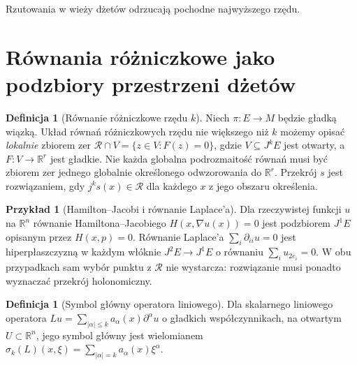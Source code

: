 \documentclass[11pt,a4paper,oneside]{book}
\numberwithin{equation}{chapter}
\theoremstyle{plain}
\theoremstyle{definition}
\newtheorem{definicja}[twierdzenie]{Definicja}
\newtheorem{przyklad}[twierdzenie]{Przykład}
\theoremstyle{remark}
\begin{document}
\begin{center}

{\small Rzutowania w wieży dżetów odrzucają pochodne najwyższego rzędu.}
\end{center}

\section{Równania różniczkowe jako podzbiory przestrzeni dżetów}
\begin{definicja}[Równanie różniczkowe rzędu $k$]
\label{def:dzety-pde}
Niech $\pi:E\to M$ będzie gładką wiązką.
Układ równań różniczkowych rzędu nie większego niż $k$
możemy opisać \emph{lokalnie} zbiorem zer
$\mathcal R\cap V=\{z\in V:F(z)=0\}$, gdzie
$V\subseteq J^kE$ jest otwarty, a
$F:V\to\mathbb R^r$ jest gładkie. Nie każda globalna
podrozmaitość równań musi być zbiorem zer jednego
globalnie określonego odwzorowania do $\mathbb R^r$.
Przekrój $s$ jest rozwiązaniem, gdy $j^ks(x)\in\mathcal R$
dla każdego $x$ z jego obszaru określenia.
\end{definicja}

\begin{przyklad}[Hamilton--Jacobi i równanie Laplace'a]
Dla rzeczywistej funkcji $u$ na $\mathbb R^n$
równanie Hamiltona--Jacobiego
$H(x,\nabla u(x))=0$ jest podzbiorem $J^1E$
opisanym przez $H(x,p)=0$. Równanie Laplace'a
$\sum_i\partial_{ii}u=0$ jest hiperpłaszczyzną
w każdym włóknie $J^2E\to J^1E$ o równaniu
$\sum_i u_{2e_i}=0$. W obu przypadkach sam wybór
punktu z $\mathcal R$ nie wystarcza: rozwiązanie
musi ponadto wyznaczać przekrój holonomiczny.
\end{przyklad}

\begin{definicja}[Symbol główny operatora liniowego]
\label{def:dzety-symbol}
Dla skalarnego liniowego operatora
$Lu=\sum_{|\alpha|\le k}a_\alpha(x)\partial^\alpha u$
o gładkich współczynnikach, na otwartym $U\subset\mathbb R^n$,
jego symbol główny jest wielomianem
$\sigma_k(L)(x,\xi)=\sum_{|\alpha|=k}a_\alpha(x)\xi^\alpha$.
\end{definicja}
\end{document}
